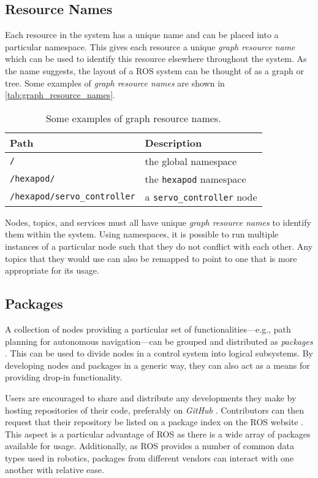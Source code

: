 \subsection{Resource Names}

Each resource in the system has a unique name and can be placed into a particular namespace. This gives each resource a unique \emph{graph resource name} which can be used to identify this resource elsewhere throughout the system. As the name suggests, the layout of a ROS system can be thought of as a graph or tree. Some examples of \emph{graph resource names} are shown in \autoref{tab:graph_resource_names}.

\begin{table}[!h]
    \centering
    \begin{tabular}{  l l  }
        \toprule
        \textbf{Path} & \textbf{Description} \\
        \midrule
        \texttt{/} & the global namespace \\
        \texttt{/hexapod/} & the \texttt{hexapod} namespace \\
        \texttt{/hexapod/servo\_controller} & a \texttt{servo\_controller} node \\
        \bottomrule
    \end{tabular}
    \caption{Some examples of graph resource names.}
    \label{tab:graph_resource_names}
\end{table}

Nodes, topics, and services must all have unique \emph{graph resource names} to identify them within the system. Using namespaces, it is possible to run multiple instances of a particular node such that they do not conflict with each other. Any topics that they would use can also be remapped to point to one that is more appropriate for its usage.

\subsection{Packages}
A collection of nodes providing a particular set of functionalities---e.g., path planning for autonomous navigation---can be grouped and distributed as \emph{packages} \cite{ros_paper}. This can be used to divide nodes in a control system into logical subsystems. By developing nodes and packages in a generic way, they can also act as a means for providing drop-in functionality.

Users are encouraged to share and distribute any developments they make by hosting repositories of their code, preferably on \emph{GitHub} \cite{ros_wiki_getinvolved}. Contributors can then request that their repository be listed on a package index on the ROS website \cite{ros_wiki_getinvolved}. This aspect is a particular advantage of ROS as there is a wide array of packages available for usage. Additionally, as ROS provides a number of common data types used in robotics, packages from different vendors can interact with one another with relative ease.

